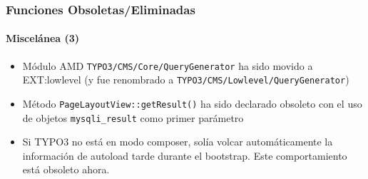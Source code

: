 \begin{frame}[fragile]
	\frametitle{Funciones Obsoletas/Eliminadas}
	\framesubtitle{Miscelánea (3)}

	\begin{itemize}

		\item Módulo AMD \texttt{TYPO3/CMS/Core/QueryGenerator} ha sido movido a EXT:lowlevel\newline
			\small
				(y fue renombrado a \texttt{TYPO3/CMS/Lowlevel/QueryGenerator})
			\normalsize

		\item Método \texttt{PageLayoutView::getResult()} ha sido declarado obsoleto 
			con el uso de objetos \texttt{mysqli\_result} como primer parámetro

		\item Si TYPO3 no está en modo composer, solía volcar automáticamente la información de autoload tarde durante el bootstrap. Este comportamiento está obsoleto ahora.
	\end{itemize}

\end{frame}

